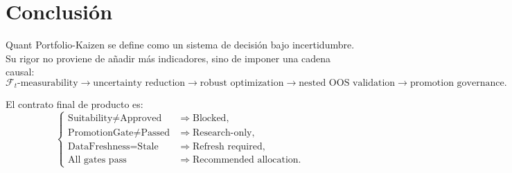\documentclass[11pt,letterpaper]{article}
\newcommand{\F}{\mathcal{F}}
\newcommand{\1}{\mathbbm{1}}
\begin{document}
\section{Conclusión}

Quant Portfolio-Kaizen se define como un sistema de decisión bajo incertidumbre. Su rigor no proviene de añadir más indicadores, sino de imponer una cadena causal:
\[
\F_t\text{-measurability}
\rightarrow
\text{uncertainty reduction}
\rightarrow
\text{robust optimization}
\rightarrow
\text{nested OOS validation}
\rightarrow
\text{promotion governance}.
\]

El contrato final de producto es:
\[
\begin{cases}
\text{Suitability}\ne\text{Approved} &\Rightarrow \text{Blocked},\\
\text{PromotionGate}\ne\text{Passed} &\Rightarrow \text{Research-only},\\
\text{DataFreshness}=\text{Stale} &\Rightarrow \text{Refresh required},\\
\text{All gates pass} &\Rightarrow \text{Recommended allocation}.
\end{cases}
\]
\end{document}
